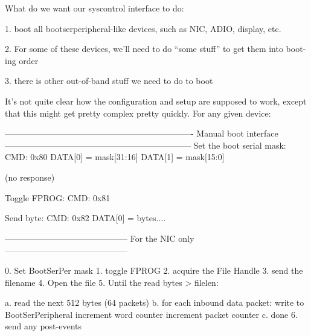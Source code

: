 
What do we want our syscontrol interface to do: 

1. boot all bootserperipheral-like devices, such as NIC, ADIO,
   display, etc.

2. For some of these devices, we'll need to do ``some stuff'' to get
   them into boot-ing order

3. there is other out-of-band stuff we need to do to boot

It's not quite clear how the configuration and setup are supposed to
work, except that this might get pretty complex pretty quickly. For
any given device:


-------------------------------------------------------------------
Manual boot interface
------------------------------------------------------------------
Set the boot serial mask: 
CMD: 0x80
DATA[0] = mask[31:16]
DATA[1] = mask[15:0]

(no response)

Toggle FPROG: 
CMD: 0x81

Send byte: 
CMD: 0x82
DATA[0] = bytes....

--------------------------------------------
For the NIC only
--------------------------------------------

0. Set BootSerPer mask 
1. toggle FPROG
2. acquire the File Handle
3. send the filename
4. Open the file
5. Until the read bytes > filelen:
   
   a. read the next 512 bytes (64 packets)
   b. for each inbound data packet: 
      write to BootSerPeripheral
      increment word counter
      increment packet counter
   c. done
6. send any post-events
